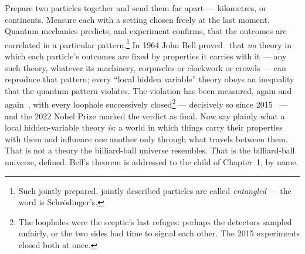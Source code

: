 \documentclass[fontsize=11pt,paper=a4,pagesize=auto,parskip=half-]{scrbook}
\begin{document}
Prepare two particles together and send them far apart --- kilometres, or continents. Measure each with a setting chosen freely at the last moment. Quantum mechanics predicts, and experiment confirms, that the outcomes are correlated in a particular pattern.\footnote{Such jointly prepared, jointly described particles are called \emph{entangled} --- the word is Schr\"odinger's.} In 1964 John Bell proved~\cite{bell1964} that \emph{no} theory in which each particle's outcomes are fixed by properties it carries with it --- any such theory, whatever its machinery, corpuscles or clockwork or crowds --- can reproduce that pattern; every ``local hidden variable'' theory obeys an inequality that the quantum pattern violates. The violation has been measured, again and again~\cite{aspect1982}, with every loophole successively closed\footnote{The loopholes were the sceptic's last refuges: perhaps the detectors sampled unfairly, or the two sides had time to signal each other. The 2015 experiments closed both at once.} --- decisively so since 2015~\cite{hensen2015,giustina2015,shalm2015} --- and the 2022 Nobel Prize marked the verdict as final. Now say plainly what a local hidden-variable theory \emph{is}: a world in which things carry their properties with them and influence one another only through what travels between them. That is not a theory the billiard-ball universe resembles. That is the billiard-ball universe, defined. Bell's theorem is addressed to the child of Chapter~1, by name.
\end{document}
